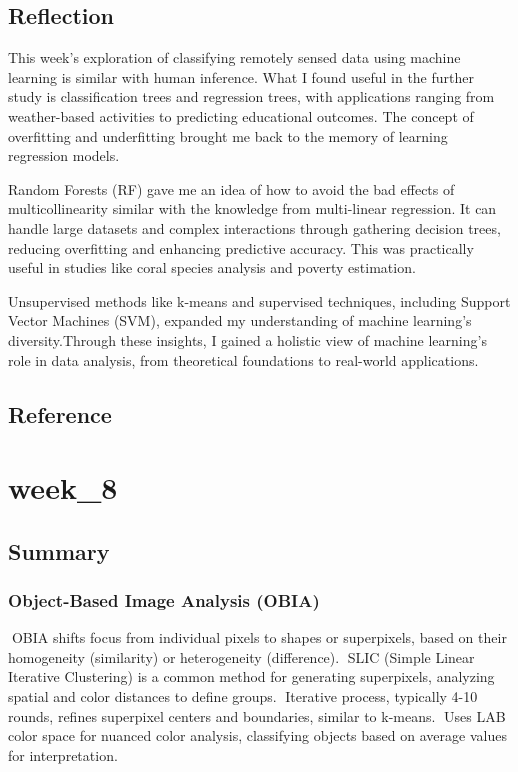 \documentclass[
  letterpaper,
  DIV=11,
  numbers=noendperiod]{scrreprt}
\begin{document}
\section{Reflection}\label{reflection-3}

This week's exploration of classifying remotely sensed data using
machine learning is similar with human inference. What I found useful in
the further study is classification trees and regression trees, with
applications ranging from weather-based activities to predicting
educational outcomes. The concept of overfitting and underfitting
brought me back to the memory of learning regression models.

Random Forests (RF) gave me an idea of how to avoid the bad effects of
multicollinearity similar with the knowledge from multi-linear
regression. It can handle large datasets and complex interactions
through gathering decision trees, reducing overfitting and enhancing
predictive accuracy. This was practically useful in studies like coral
species analysis and poverty estimation.

Unsupervised methods like k-means and supervised techniques, including
Support Vector Machines (SVM), expanded my understanding of machine
learning's diversity.Through these insights, I gained a holistic view of
machine learning's role in data analysis, from theoretical foundations
to real-world applications.

\section{\texorpdfstring{\textbf{Reference}}{Reference}}\label{reference}


\chapter{week\_8}\label{week_8}

\section{Summary}\label{summary-2}

\subsection{Object-Based Image Analysis
(OBIA)}\label{object-based-image-analysis-obia}

OBIA shifts focus from individual pixels to shapes or superpixels,
based on their homogeneity (similarity) or heterogeneity (difference).
SLIC (Simple Linear Iterative Clustering) is a common method for
generating superpixels, analyzing spatial and color distances to define
groups. Iterative process, typically 4-10 rounds, refines superpixel
centers and boundaries, similar to k-means. Uses LAB color space for
nuanced color analysis, classifying objects based on average values for
interpretation.
\end{document}
